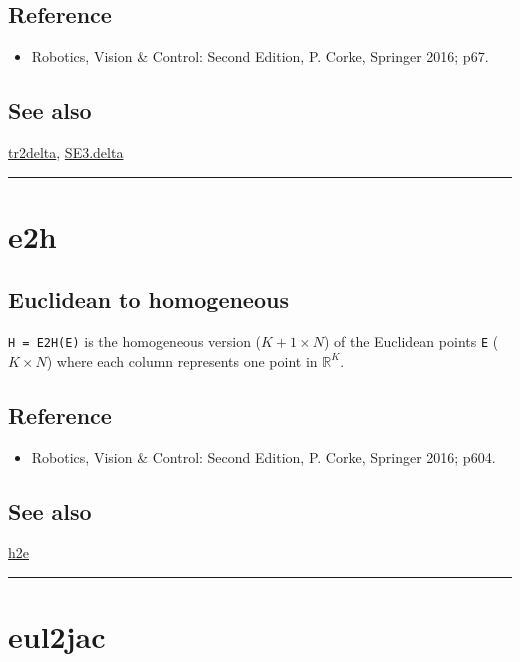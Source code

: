 \subsection*{Reference}
\begin{itemize}
  \item Robotics, Vision \& Control: Second Edition, P. Corke, Springer 2016; p67.
\end{itemize}

\subsection*{See also}


\hyperlink{tr2delta}{\color{blue} tr2delta}, \hyperlink{SE3.delta}{\color{blue} SE3.delta}

\vspace{1.5ex}\rule{\textwidth}{1mm}

\hypertarget{e2h}{\section*{e2h}}
\subsection*{Euclidean to homogeneous}


\texttt{H = E2H(E)} is the homogeneous version ($K+1 \times N$) of the Euclidean
points \texttt{E} ($K \times N$) where each column represents one point in $\mathbb{R}^{K}$.


\subsection*{Reference}
\begin{itemize}
  \item Robotics, Vision \& Control: Second Edition, P. Corke, Springer 2016; p604.
\end{itemize}

\subsection*{See also}


\hyperlink{h2e}{\color{blue} h2e}

\vspace{1.5ex}\rule{\textwidth}{1mm}

\hypertarget{eul2jac}{\section*{eul2jac}}
